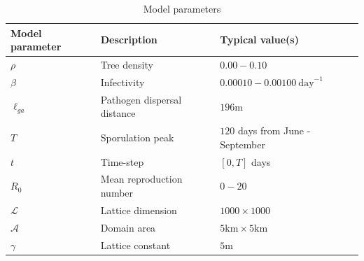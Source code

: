 



\begin{table}[h]
\centering
\begin{tabular}{l l l}
\hline
\textbf{Model parameter} & \textbf{Description} & \textbf{Typical value(s)}\\
\hline
$\rho$  & Tree density & $0.00 - 0.10$ \\ 
$\beta$ & Infectivity & $0.00010 - 0.00100\ \mathrm{day}^{-1}$ \\
$\ell_{ga}$ & Pathogen dispersal distance & $196\mathrm{m}$ \\
$T$ & Sporulation peak & $120$ days from June - September \\
$t$ & Time-step & $[0, T]$ days\\
$R_0$ & Mean reproduction number & $0-20$ \\
$\mathcal{L}$ & Lattice dimension & $1000\times1000$ \\
$\mathcal{A}$ & Domain area & $5\mathrm{km}\times5\mathrm{km}$ \\
$\gamma$ & Lattice constant & $5\mathrm{m}$ \\
\hline
\end{tabular}
\caption{Model parameters}
\end{table}


